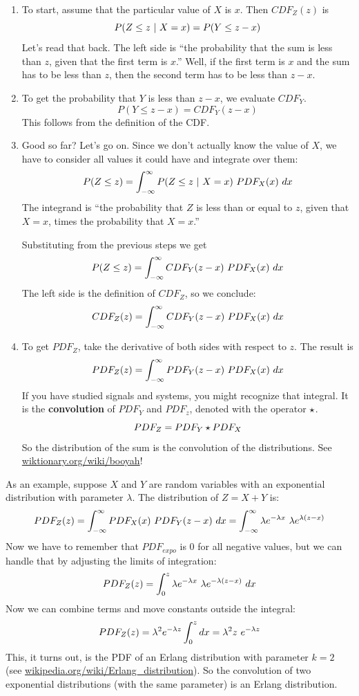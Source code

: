 \documentclass[12pt]{book}
\begin{document}
\begin{enumerate}

\item To start, assume that the particular value
of $X$ is $x$.  Then $CDF_Z(z)$ is 
%
\[ P(Z \le z ~|~ X = x)  =  P(Y \le z-x) \]
%
Let's read that back.  
The left side is ``the probability that the sum is less than
$z$, given that the first term is $x$.''  Well, if
the first term is $x$ and the sum has to be less than $z$, then the
second term has to be less than $z-x$.

\item To get the probability that $Y$ is less than $z-x$, we
evaluate $CDF_Y$.
%
\[ P(Y \le z-x) = CDF_Y(z-x) \]
%
This follows from the definition of the CDF.

\item Good so far?  Let's go on.  Since we don't actually know
the value of $X$, we have to consider all values it could have and
integrate over them:
%
\[ P(Z \le z) = \int_{-\infty}^{\infty} P(Z \le z ~|~ X = x) ~ PDF_X(x) ~ dx \]
%
The integrand is ``the probability that $Z$ is less than or equal
to $z$, given that $X=x$, times the probability that $X=x$.''

Substituting from the previous steps we get
%
\[ P(Z \le z) = \int_{-\infty}^{\infty} CDF_Y(z-x) ~ PDF_X(x) ~ dx \]
%
The left side is the definition of $CDF_Z$, so we conclude:
%
\[ CDF_Z(z) = \int_{-\infty}^{\infty} CDF_Y(z-x) ~ PDF_X(x) ~ dx \]
%

\item To get $PDF_Z$, take the derivative of
both sides with respect to $z$.  The result is
%
\[ PDF_Z(z) = \int_{-\infty}^{\infty} PDF_Y(z-x) ~ PDF_X(x) ~ dx  \]
%
If you have studied signals and systems, you might recognize that
integral.  It is the {\bf convolution} of $PDF_Y$ and $PDF_z$, denoted
with the operator $\star$.
%
\[ PDF_Z = PDF_Y \star PDF_X \]
%
So the distribution of the sum is the convolution of the distributions.
See \url{wiktionary.org/wiki/booyah}!


\end{enumerate}


As an example, suppose $X$ and $Y$ are random variables with an
exponential distribution with parameter $\lambda$.  
The distribution of $Z = X + Y$ is:
%
\[ PDF_Z(z) = \int_{-\infty}^{\infty} PDF_X(x)~PDF_Y(z-x) ~ dx = 
\int_{-\infty}^{\infty} \lambda e^{-\lambda x}~\lambda e^{\lambda (z-x)} \]
%
Now we have to remember that $PDF_{expo}$ is 0 for all negative
values, but we can handle that by adjusting the limits of integration:
%
\[ PDF_Z(z) = \int_{0}^{z} \lambda e^{-\lambda x}~\lambda e^{-\lambda (z-x)} ~ dx \]
%
Now we can combine terms and move constants outside the integral:
%
\[ PDF_Z(z) = \lambda^2 e^{-\lambda z} \int_{0}^{z} dx = 
\lambda^2 z ~ e^{-\lambda z} \]
% 
This, it turns out, is the PDF of an Erlang distribution with
parameter $k=2$ (see \url{wikipedia.org/wiki/Erlang_distribution}).
So the convolution of two exponential distributions (with the same
parameter) is an Erlang distribution.
\end{document}
